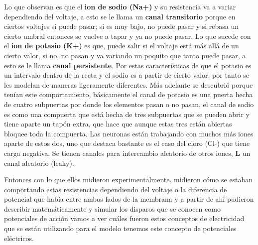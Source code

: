 Lo que observan es que el \textbf{ion de sodio (Na+)} y su resistencia va a variar dependiendo del voltaje, a esto se le llama un \textbf{canal transitorio} porque en ciertos voltajes si puede pasar; si es muy bajo, no puede pasar y si rebasa un cierto umbral entonces se vuelve a tapar y ya no puede pasar. 
Lo que sucede con el \textbf{ion de potasio (K+)} es que, puede salir si el voltaje está más allá de un cierto valor, si no, no pasan y va variando un poquito que tanto puede pasar, a esto se le llama \textbf{canal persistente}. Por estas características de que el potasio es un intervalo dentro de la recta y el sodio es a partir de cierto valor, por tanto se les modelan de maneras ligeramente diferentes. Más adelante se descubrió porque tenían este comportamiento, básicamente el canal de potasio es una puerta hecha de cuatro subpuertas por donde los elementos pasan o no pasan, el canal de sodio es como una compuerta que está hecha de tres subpuertas que se pueden abrir y tiene aparte un tapón extra, que hace que  aunque estas tres están abiertas bloquee toda la compuerta.
Las neuronas están trabajando con muchos más iones aparte de estos dos, uno que destaca bastante es el caso del cloro (Cl-) que tiene carga negativa. Se tienen canales para intercambio aleatorio de otros iones, \textbf{L} un canal aleatorio (leaky).

Entonces con lo que ellos midieron experimentalmente, midieron cómo se estaban comportando estas resistencias dependiendo del voltaje o la diferencia de potencial que había entre ambos lados de la membrana y a partir de ahí pudieron describir matemáticamente y simular los disparos que se conocen como potenciales de acción vamos a ver cuáles fueron estos conceptos de electricidad que se están utilizando para el modelo tenemos este concepto de potenciales eléctricos.


